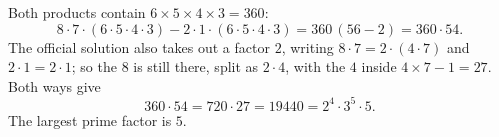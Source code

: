 Both products contain $6\times5\times4\times3=360$:
\[
8\cdot7\cdot(6\cdot5\cdot4\cdot3)-2\cdot1\cdot(6\cdot5\cdot4\cdot3)=360\,(56-2)=360\cdot54 .
\]
The official solution also takes out a factor $2$, writing $8\cdot7=2\cdot(4\cdot7)$ and $2\cdot1=2\cdot1$; so the $8$ is still there, split as $2\cdot4$, with the $4$ inside $4\times7-1=27$. Both ways give
\[
360\cdot54=720\cdot27=19440=2^4\cdot3^5\cdot5 .
\]
The largest prime factor is $\boxed{5}$.
